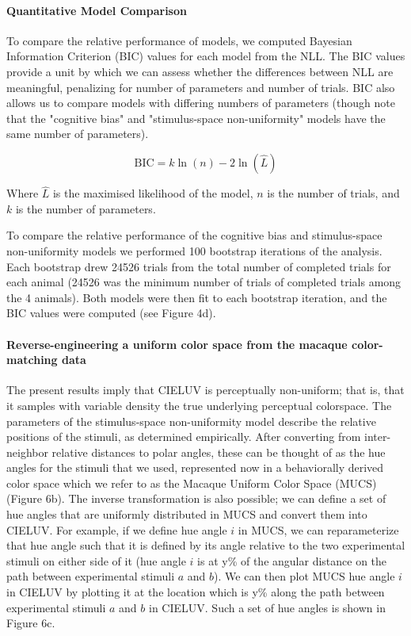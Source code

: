 \documentclass[9pt,biorxiv,lineno,onehalfspacing]{lapreprint}
\begin{document}
\begin{refsection}
\paragraph{Quantitative Model Comparison}
To compare the relative performance of models, we computed Bayesian Information Criterion (BIC) values for each model from the NLL. 
The BIC values provide a unit by which we can assess whether the differences between NLL are meaningful, penalizing for number of parameters and number of trials. 
BIC also allows us to compare models with differing numbers of parameters (though note that the "cognitive bias" and "stimulus-space non-uniformity" models have the same number of parameters).

\begin{equation}
    \text{BIC} = k\ln(n)-2\ln(\hat{L})
\end{equation}

Where $\hat{L}$ is the maximised likelihood of the model, $n$ is the number of trials, and $k$ is the number of parameters.

To compare the relative performance of the cognitive bias and stimulus-space non-uniformity models we performed 100 bootstrap iterations of the analysis. 
Each bootstrap drew 24526 trials from the total number of completed trials for each animal (24526 was the minimum number of trials of completed trials among the 4 animals). 
Both models were then fit to each bootstrap iteration, and the BIC values were computed (see Figure 4d).

\paragraph{Reverse-engineering a uniform color space from the macaque color-matching data}

The present results imply that CIELUV is perceptually non-uniform; that is, that it samples with variable density the true underlying perceptual colorspace. 
The parameters of the stimulus-space non-uniformity model describe the relative positions of the stimuli, as determined empirically. 
After converting from inter-neighbor relative distances to polar angles, these can be thought of as the hue angles for the stimuli that we used, represented now in a behaviorally derived color space which we refer to as the Macaque Uniform Color Space (MUCS) (Figure 6b). 
The inverse transformation is also possible; we can define a set of hue angles that are uniformly distributed in MUCS and convert them into CIELUV. 
For example, if we define hue angle $i$ in MUCS, we can reparameterize that hue angle such that it is defined by its angle relative to the two experimental stimuli on either side of it (hue angle $i$ is at y\% of the angular distance on the path between experimental stimuli $a$ and $b$). 
We can then plot MUCS hue angle $i$ in CIELUV by plotting it at the location which is y\% along the path between experimental stimuli $a$ and $b$ in CIELUV. 
Such a set of hue angles is shown in Figure 6c. 


\end{refsection}
\end{document}
